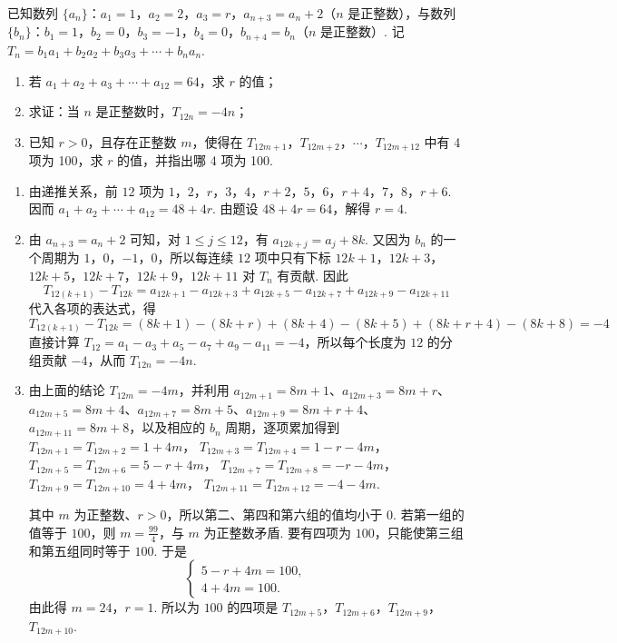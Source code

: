 \begin{problem}
已知数列 \(\{a_{n}\}\)：\(a_{1} = 1\)，\(a_{2} = 2\)，\(a_{3} = r\)，\(a_{n+3} = a_{n} + 2\)（\(n\) 是正整数），与数列 \(\{b_{n}\}\)：\(b_{1} = 1\)，\(b_{2} = 0\)，\(b_{3} = -1\)，\(b_{4} = 0\)，\(b_{n+4} = b_{n}\)（\(n\) 是正整数）. 记 \(T_{n} = b_{1}a_{1} + b_{2}a_{2} + b_{3}a_{3} + \cdots + b_{n}a_{n}\).

\begin{enumerate}
\item 若 \(a_1 + a_2 + a_3 + \cdots + a_{12} = 64\)，求 \(r\) 的值；
\item 求证：当 \(n\) 是正整数时，\(T_{12n} = -4n\)；
\item 已知 \(r > 0\)，且存在正整数 \(m\)，使得在 \(T_{12m+1}\)，\(T_{12m+2}\)，\(\cdots\)，\(T_{12m+12}\) 中有 4 项为 100，求 \(r\) 的值，并指出哪 4 项为 100.
\end{enumerate}
\end{problem}

\begin{solution}
\begin{enumerate}
\item 由递推关系，前 \(12\) 项为 \(1\)，\(2\)，\(r\)，\(3\)，\(4\)，\(r+2\)，\(5\)，\(6\)，\(r+4\)，\(7\)，\(8\)，\(r+6\). 因而
\(a_1+a_2+\cdots+a_{12}=48+4r\).
由题设 \(48+4r=64\)，解得 \(r=4\).

\item 由 \(a_{n+3}=a_n+2\) 可知，对 \(1\leqslant j\leqslant12\)，有 \(a_{12k+j}=a_j+8k\). 又因为 \(b_n\) 的一个周期为 \(1\)，\(0\)，\(-1\)，\(0\)，所以每连续 \(12\) 项中只有下标 \(12k+1\)，\(12k+3\)，\(12k+5\)，\(12k+7\)，\(12k+9\)，\(12k+11\) 对 \(T_n\) 有贡献. 因此
\[
T_{12(k+1)}-T_{12k}=a_{12k+1}-a_{12k+3}+a_{12k+5}-a_{12k+7}+a_{12k+9}-a_{12k+11}
\]
代入各项的表达式，得
\[
T_{12(k+1)}-T_{12k}=(8k+1)-(8k+r)+(8k+4)-(8k+5)+(8k+r+4)-(8k+8)=-4
\]
直接计算 \(T_{12}=a_1-a_3+a_5-a_7+a_9-a_{11}=-4\)，所以每个长度为 \(12\) 的分组贡献 \(-4\)，从而 \(T_{12n}=-4n\).

\item 由上面的结论 \(T_{12m}=-4m\)，并利用 \(a_{12m+1}=8m+1\)、\(a_{12m+3}=8m+r\)、\(a_{12m+5}=8m+4\)、\(a_{12m+7}=8m+5\)、\(a_{12m+9}=8m+r+4\)、\(a_{12m+11}=8m+8\)，以及相应的 \(b_n\) 周期，逐项累加得到
\(T_{12m+1}=T_{12m+2}=1+4m\)，
\(T_{12m+3}=T_{12m+4}=1-r-4m\)，
\(T_{12m+5}=T_{12m+6}=5-r+4m\)，
\(T_{12m+7}=T_{12m+8}=-r-4m\)，
\(T_{12m+9}=T_{12m+10}=4+4m\)，
\(T_{12m+11}=T_{12m+12}=-4-4m\).

其中 \(m\) 为正整数、\(r>0\)，所以第二、第四和第六组的值均小于 \(0\). 若第一组的值等于 \(100\)，则 \(m=\frac{99}{4}\)，与 \(m\) 为正整数矛盾. 要有四项为 \(100\)，只能使第三组和第五组同时等于 \(100\). 于是
\[
\begin{cases}
5-r+4m=100,\\
4+4m=100.
\end{cases}
\]
由此得 \(m=24\)，\(r=1\). 所以为 \(100\) 的四项是 \(T_{12m+5}\)，\(T_{12m+6}\)，\(T_{12m+9}\)，\(T_{12m+10}\).
\end{enumerate}
\end{solution}
